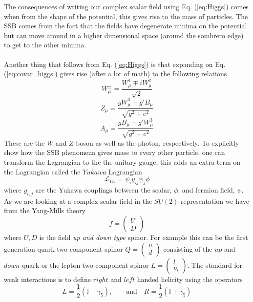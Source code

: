 \documentclass[12pt, a4paper]{book}
\begin{document}
The consequences of writing our complex scalar field using Eq. (\ref{eq:Higgs}) comes when from the shape of the potential, this gives rise to the mass of particles. The SSB comes from the fact that the fields have degenerate minima 
on the potential but can move around in a higher dimensional space (around the sombrero edge) to get to the other minima.\\
\\Another thing that follows from Eq. (\ref{eq:Higgs}) is that expanding on Eq. (\ref{eq:covar_higgs}) gives rise (after a lot of math) to the following relations
\begin{equation}\label{eq:W_boson}
    W_\mu^\pm = \frac{W_\mu^1 \mp iW_\mu^2}{\sqrt{2}}
\end{equation}
\begin{equation}\label{eq:Z_boson}
    Z_\mu = \frac{gW_\mu^3 - g'B_\mu}{\sqrt{g^2+e^2}}
\end{equation}
\begin{equation}\label{eq:photon}
    A_\mu = \frac{gB_\mu - g'W_\mu^3}{\sqrt{g^2+e^2}}
\end{equation}
These are the $W$ and $Z$ boson as well as the photon, respectively. To explicitly show how the SSB phenomena gives mass to every other particle, one can transform the Lagrangian to the the unitary gauge, 
this adds an extra term on the Lagrangian called the $Yukawa$ Lagrangian
$$
\mathcal{L}_{YU} = \psi_i y_{ij}\psi_j\phi
$$
where $y_{i,j}$ are the Yukawa couplings between the scalar, $\phi$, and fermion field, $\psi$. As we are looking at a complex scalar field in the $SU(2)$ representation we have from the Yang-Mills theory
$$
f=\begin{pmatrix}
    U\\D
\end{pmatrix}
$$
where $U,D$ is the field \textit{up and down type} spinor. For example this can be the first generation quark two component spinor $Q = \begin{pmatrix}
    u\\ d
\end{pmatrix}$ consisting of the $up$ and $down$ quark or the lepton two component spinor $L = \begin{pmatrix}
    l\\ \nu_l
\end{pmatrix}$. The standard for weak interactions is to define $right$ and $left$ handed helicity using the operators 
$$
L = \frac{1}{2}(\mathbb{I} - \gamma_5),\qquad\text{and}\quad R = \frac{1}{2}(\mathbb{I} + \gamma_5)
$$
\end{document}
